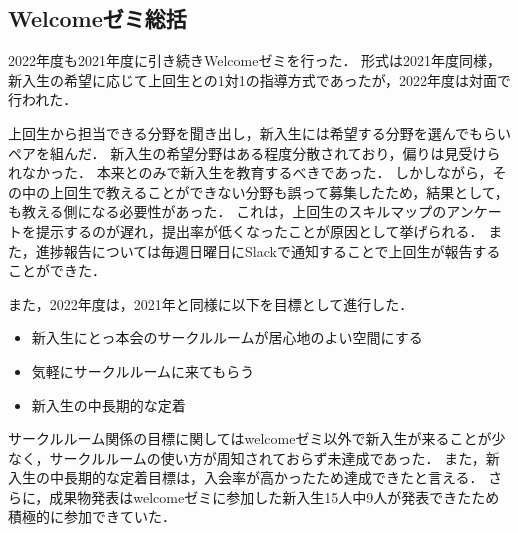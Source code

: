 \subsection*{Welcomeゼミ総括}


2022年度も2021年度に引き続きWelcomeゼミを行った．
形式は2021年度同様，新入生の希望に応じて上回生との1対1の指導方式であったが，2022年度は対面で行われた．

上回生から担当できる分野を聞き出し，新入生には希望する分野を選んでもらいペアを組んだ．
新入生の希望分野はある程度分散されており，偏りは見受けられなかった．
本来\secondGrade{}と\thirdGrade{}のみで新入生を教育するべきであった．
しかしながら，その中の上回生で教えることができない分野も誤って募集したため，結果として，\fourthGrade{}も教える側になる必要性があった．
これは，上回生のスキルマップのアンケートを提示するのが遅れ，提出率が低くなったことが原因として挙げられる．
また，進捗報告については毎週日曜日にSlackで通知することで上回生が報告することができた．

また，2022年度は，2021年と同様に以下を目標として進行した．
\begin{itemize}
	\item 新入生にとっ本会のサークルルームが居心地のよい空間にする
	\item 気軽にサークルルームに来てもらう
	\item 新入生の中長期的な定着
\end{itemize}

サークルルーム関係の目標に関してはwelcomeゼミ以外で新入生が来ることが少なく，サークルルームの使い方が周知されておらず未達成であった．
また，新入生の中長期的な定着目標は，入会率が高かったため達成できたと言える．
さらに，成果物発表はwelcomeゼミに参加した新入生15人中9人が発表できたため積極的に参加できていた．
